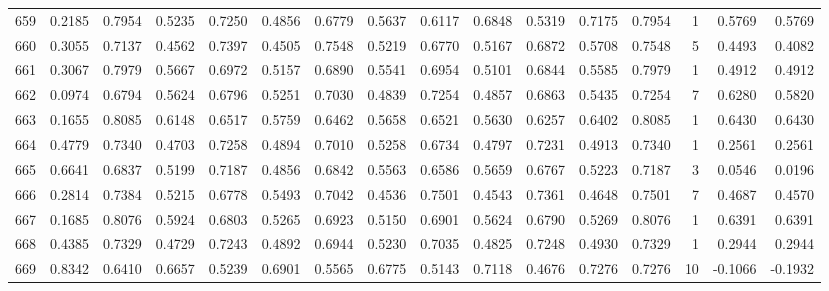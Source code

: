 \begin{tabular}{lrrrrrrrrrrrrrrr}
659 &      0.2185 &  0.7954 &  0.5235 &  0.7250 &  0.4856 &  0.6779 &  0.5637 &  0.6117 &  0.6848 &  0.5319 &   0.7175 &     0.7954 &      1 &                    0.5769 &                     0.5769 \\
660 &      0.3055 &  0.7137 &  0.4562 &  0.7397 &  0.4505 &  0.7548 &  0.5219 &  0.6770 &  0.5167 &  0.6872 &   0.5708 &     0.7548 &      5 &                    0.4493 &                     0.4082 \\
661 &      0.3067 &  0.7979 &  0.5667 &  0.6972 &  0.5157 &  0.6890 &  0.5541 &  0.6954 &  0.5101 &  0.6844 &   0.5585 &     0.7979 &      1 &                    0.4912 &                     0.4912 \\
662 &      0.0974 &  0.6794 &  0.5624 &  0.6796 &  0.5251 &  0.7030 &  0.4839 &  0.7254 &  0.4857 &  0.6863 &   0.5435 &     0.7254 &      7 &                    0.6280 &                     0.5820 \\
663 &      0.1655 &  0.8085 &  0.6148 &  0.6517 &  0.5759 &  0.6462 &  0.5658 &  0.6521 &  0.5630 &  0.6257 &   0.6402 &     0.8085 &      1 &                    0.6430 &                     0.6430 \\
664 &      0.4779 &  0.7340 &  0.4703 &  0.7258 &  0.4894 &  0.7010 &  0.5258 &  0.6734 &  0.4797 &  0.7231 &   0.4913 &     0.7340 &      1 &                    0.2561 &                     0.2561 \\
665 &      0.6641 &  0.6837 &  0.5199 &  0.7187 &  0.4856 &  0.6842 &  0.5563 &  0.6586 &  0.5659 &  0.6767 &   0.5223 &     0.7187 &      3 &                    0.0546 &                     0.0196 \\
666 &      0.2814 &  0.7384 &  0.5215 &  0.6778 &  0.5493 &  0.7042 &  0.4536 &  0.7501 &  0.4543 &  0.7361 &   0.4648 &     0.7501 &      7 &                    0.4687 &                     0.4570 \\
667 &      0.1685 &  0.8076 &  0.5924 &  0.6803 &  0.5265 &  0.6923 &  0.5150 &  0.6901 &  0.5624 &  0.6790 &   0.5269 &     0.8076 &      1 &                    0.6391 &                     0.6391 \\
668 &      0.4385 &  0.7329 &  0.4729 &  0.7243 &  0.4892 &  0.6944 &  0.5230 &  0.7035 &  0.4825 &  0.7248 &   0.4930 &     0.7329 &      1 &                    0.2944 &                     0.2944 \\
669 &      0.8342 &  0.6410 &  0.6657 &  0.5239 &  0.6901 &  0.5565 &  0.6775 &  0.5143 &  0.7118 &  0.4676 &   0.7276 &     0.7276 &     10 &                   -0.1066 &                    -0.1932 \\

\end{tabular}
